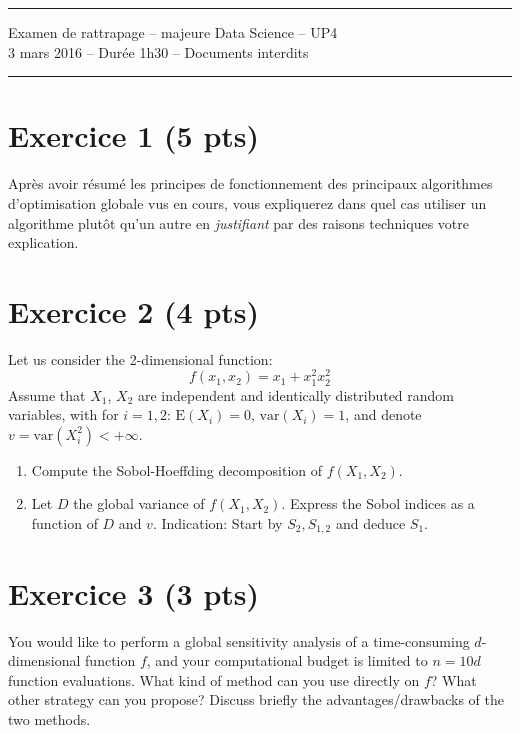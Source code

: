\documentclass{article}
\newcommand{\var}{\mbox{var}}
\newcommand{\E}{\mbox{E}}
\begin{document}
\begin{center}
\hrule \vspace{3mm}
	{\Large Examen de rattrapage -- majeure Data Science -- UP4}\\ \vspace{3mm}
	{3 mars 2016 -- Durée 1h30 -- Documents interdits}\\ \vspace{3mm}
	\hrule
\end{center}
\vspace{5mm}

\section*{Exercice 1 (5 pts)}
Après avoir résumé les principes de fonctionnement des principaux algorithmes d'optimisation globale vus en cours, vous expliquerez dans quel cas utiliser un algorithme plutôt qu'un autre en \emph{justifiant} par des raisons techniques votre explication.

\section*{Exercice 2 (4 pts)}
Let us consider the 2-dimensional function:
$$f(x_{1},x_{2})= x_1 + x_1^2 x_2^2$$
Assume that $X_{1}$, $X_{2}$ are independent and identically distributed random variables, with for $i=1,2$: $\E(X_i)=0$, $\var(X_i)=1$, and denote $v = \var(X_i^2)<+\infty$.
\begin{enumerate}
\item Compute the Sobol-Hoeffding decomposition of $f(X_1,X_2)$.
\item Let $D$ the global variance of $f(X_1, X_2)$. Express the Sobol indices as a function of $D$ and $v$. Indication: Start by $S_2, S_{1,2}$ and deduce $S_1$.
\end{enumerate}

\section*{Exercice 3 (3 pts)}
You would like to perform a global sensitivity analysis of a time-consuming $d$-dimensional function $f$, and your computational budget is limited to $n=10d$ function evaluations. What kind of method can you use directly on $f$? What other strategy can you propose? Discuss briefly the advantages/drawbacks of the two methods.
\end{document}
